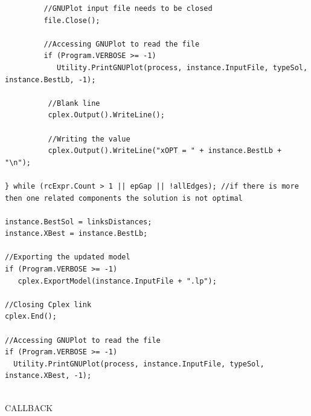 \documentclass[11pt]{article}
\begin{document}
\begin{lstlisting}
         //GNUPlot input file needs to be closed
         file.Close();

         //Accessing GNUPlot to read the file
         if (Program.VERBOSE >= -1)
            Utility.PrintGNUPlot(process, instance.InputFile, typeSol, instance.BestLb, -1);

          //Blank line
          cplex.Output().WriteLine();

          //Writing the value
          cplex.Output().WriteLine("xOPT = " + instance.BestLb + "\n");

} while (rcExpr.Count > 1 || epGap || !allEdges); //if there is more then one related components the solution is not optimal 

instance.BestSol = linksDistances;
instance.XBest = instance.BestLb;

//Exporting the updated model
if (Program.VERBOSE >= -1)
   cplex.ExportModel(instance.InputFile + ".lp");

//Closing Cplex link
cplex.End();

//Accessing GNUPlot to read the file
if (Program.VERBOSE >= -1)
  Utility.PrintGNUPlot(process, instance.InputFile, typeSol, instance.XBest, -1);
  
\end{lstlisting}



\vspace{2\baselineskip}
CALLBACK
\vspace{2\baselineskip}
\end{document}
